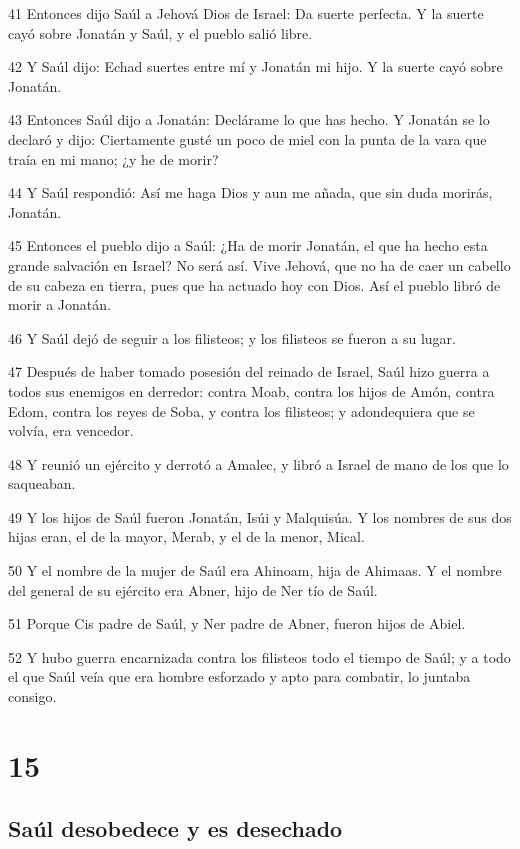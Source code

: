 \par 41 Entonces dijo Saúl a Jehová Dios de Israel: Da suerte perfecta. Y la suerte cayó sobre Jonatán y Saúl, y el pueblo salió libre.
\par 42 Y Saúl dijo: Echad suertes entre mí y Jonatán mi hijo. Y la suerte cayó sobre Jonatán.
\par 43 Entonces Saúl dijo a Jonatán: Declárame lo que has hecho. Y Jonatán se lo declaró y dijo: Ciertamente gusté un poco de miel con la punta de la vara que traía en mi mano; ¿y he de morir?
\par 44 Y Saúl respondió: Así me haga Dios y aun me añada, que sin duda morirás, Jonatán.
\par 45 Entonces el pueblo dijo a Saúl: ¿Ha de morir Jonatán, el que ha hecho esta grande salvación en Israel? No será así. Vive Jehová, que no ha de caer un cabello de su cabeza en tierra, pues que ha actuado hoy con Dios. Así el pueblo libró de morir a Jonatán.
\par 46 Y Saúl dejó de seguir a los filisteos; y los filisteos se fueron a su lugar.
\par 47 Después de haber tomado posesión del reinado de Israel, Saúl hizo guerra a todos sus enemigos en derredor: contra Moab, contra los hijos de Amón, contra Edom, contra los reyes de Soba, y contra los filisteos; y adondequiera que se volvía, era vencedor.
\par 48 Y reunió un ejército y derrotó a Amalec, y libró a Israel de mano de los que lo saqueaban.
\par 49 Y los hijos de Saúl fueron Jonatán, Isúi y Malquisúa. Y los nombres de sus dos hijas eran, el de la mayor, Merab, y el de la menor, Mical.
\par 50 Y el nombre de la mujer de Saúl era Ahinoam, hija de Ahimaas. Y el nombre del general de su ejército era Abner, hijo de Ner tío de Saúl.
\par 51 Porque Cis padre de Saúl, y Ner padre de Abner, fueron hijos de Abiel.
\par 52 Y hubo guerra encarnizada contra los filisteos todo el tiempo de Saúl; y a todo el que Saúl veía que era hombre esforzado y apto para combatir, lo juntaba consigo.

\chapter{15}

\section*{Saúl desobedece y es desechado}

